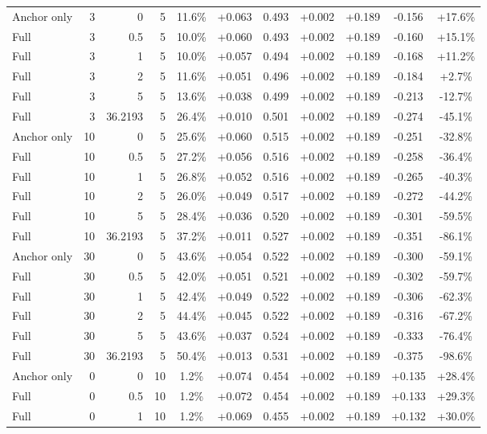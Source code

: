 \begin{table}[htbp]
\begin{tabular}{lrrrccccccc}
Anchor only & 3 & 0 & 5 & 11.6\% & +0.063 & 0.493 & +0.002 & +0.189 & -0.156 & +17.6\% \\
Full & 3 & 0.5 & 5 & 10.0\% & +0.060 & 0.493 & +0.002 & +0.189 & -0.160 & +15.1\% \\
Full & 3 & 1 & 5 & 10.0\% & +0.057 & 0.494 & +0.002 & +0.189 & -0.168 & +11.2\% \\
Full & 3 & 2 & 5 & 11.6\% & +0.051 & 0.496 & +0.002 & +0.189 & -0.184 & +2.7\% \\
Full & 3 & 5 & 5 & 13.6\% & +0.038 & 0.499 & +0.002 & +0.189 & -0.213 & -12.7\% \\
Full & 3 & 36.2193 & 5 & 26.4\% & +0.010 & 0.501 & +0.002 & +0.189 & -0.274 & -45.1\% \\
Anchor only & 10 & 0 & 5 & 25.6\% & +0.060 & 0.515 & +0.002 & +0.189 & -0.251 & -32.8\% \\
Full & 10 & 0.5 & 5 & 27.2\% & +0.056 & 0.516 & +0.002 & +0.189 & -0.258 & -36.4\% \\
Full & 10 & 1 & 5 & 26.8\% & +0.052 & 0.516 & +0.002 & +0.189 & -0.265 & -40.3\% \\
Full & 10 & 2 & 5 & 26.0\% & +0.049 & 0.517 & +0.002 & +0.189 & -0.272 & -44.2\% \\
Full & 10 & 5 & 5 & 28.4\% & +0.036 & 0.520 & +0.002 & +0.189 & -0.301 & -59.5\% \\
Full & 10 & 36.2193 & 5 & 37.2\% & +0.011 & 0.527 & +0.002 & +0.189 & -0.351 & -86.1\% \\
Anchor only & 30 & 0 & 5 & 43.6\% & +0.054 & 0.522 & +0.002 & +0.189 & -0.300 & -59.1\% \\
Full & 30 & 0.5 & 5 & 42.0\% & +0.051 & 0.521 & +0.002 & +0.189 & -0.302 & -59.7\% \\
Full & 30 & 1 & 5 & 42.4\% & +0.049 & 0.522 & +0.002 & +0.189 & -0.306 & -62.3\% \\
Full & 30 & 2 & 5 & 44.4\% & +0.045 & 0.522 & +0.002 & +0.189 & -0.316 & -67.2\% \\
Full & 30 & 5 & 5 & 43.6\% & +0.037 & 0.524 & +0.002 & +0.189 & -0.333 & -76.4\% \\
Full & 30 & 36.2193 & 5 & 50.4\% & +0.013 & 0.531 & +0.002 & +0.189 & -0.375 & -98.6\% \\
Anchor only & 0 & 0 & 10 & 1.2\% & +0.074 & 0.454 & +0.002 & +0.189 & +0.135 & +28.4\% \\
Full & 0 & 0.5 & 10 & 1.2\% & +0.072 & 0.454 & +0.002 & +0.189 & +0.133 & +29.3\% \\
Full & 0 & 1 & 10 & 1.2\% & +0.069 & 0.455 & +0.002 & +0.189 & +0.132 & +30.0\% \\

\end{tabular}
\end{table}
